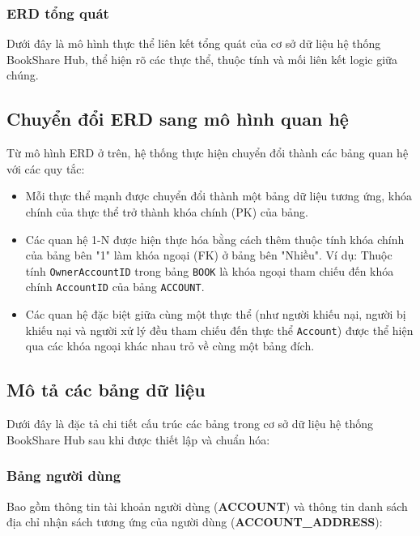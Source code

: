 \subsubsection{ERD tổng quát}

Dưới đây là mô hình thực thể liên kết tổng quát của cơ sở dữ liệu hệ thống BookShare Hub, thể hiện rõ các thực thể, thuộc tính và mối liên kết logic giữa chúng.


\subsection{Chuyển đổi ERD sang mô hình quan hệ}

Từ mô hình ERD ở trên, hệ thống thực hiện chuyển đổi thành các bảng quan hệ với các quy tắc:
\begin{itemize}
    \item Mỗi thực thể mạnh được chuyển đổi thành một bảng dữ liệu tương ứng, khóa chính của thực thể trở thành khóa chính (PK) của bảng.
    \item Các quan hệ 1-N  được hiện thực hóa bằng cách thêm thuộc tính khóa chính của bảng bên "1" làm khóa ngoại (FK) ở bảng bên "Nhiều". Ví dụ: Thuộc tính \texttt{OwnerAccountID} trong bảng \texttt{BOOK} là khóa ngoại tham chiếu đến khóa chính \texttt{AccountID} của bảng \texttt{ACCOUNT}.
    \item Các quan hệ đặc biệt giữa cùng một thực thể (như người khiếu nại, người bị khiếu nại và người xử lý đều tham chiếu đến thực thể \texttt{Account}) được thể hiện qua các khóa ngoại khác nhau trỏ về cùng một bảng đích.
\end{itemize}

\subsection{Mô tả các bảng dữ liệu}

Dưới đây là đặc tả chi tiết cấu trúc các bảng trong cơ sở dữ liệu hệ thống BookShare Hub sau khi được thiết lập và chuẩn hóa:

\subsubsection{Bảng người dùng}

Bao gồm thông tin tài khoản người dùng (\textbf{ACCOUNT}) và thông tin danh sách địa chỉ nhận sách tương ứng của người dùng (\textbf{ACCOUNT\_ADDRESS}):

